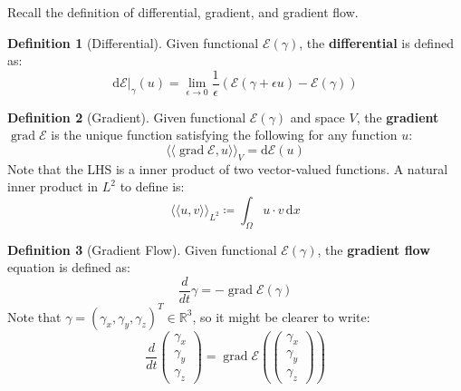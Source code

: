 \documentclass[a4paper, 11pt]{article}
\newcommand{\dx}{\,\text{d}x}
\newcommand{\inner}[1]{\langle \langle #1 \rangle \rangle}
\DeclareMathOperator{\grad}{grad}
\theoremstyle{definition}
\newtheorem{definition}{Definition}
\theoremstyle{remark}
\begin{document}
Recall the definition of differential, gradient, and gradient flow.
\begin{definition}[Differential]
    Given functional $\mathcal{E}(\gamma)$, the \textbf{differential} is defined as:
    \begin{equation}
        \text{d}\mathcal{E}|_{\gamma} (u) = \lim_{\epsilon \rightarrow 0} \frac{1}{\epsilon} \left( \mathcal{E}\left( \gamma + \epsilon u \right) - \mathcal{E}\left( \gamma \right) \right)
    \end{equation}
\end{definition}

\begin{definition}[Gradient]
    Given functional $\mathcal{E}\left( \gamma \right)$ and space $V$, the \textbf{gradient} $\grad \mathcal{E}$ is the unique function satisfying the following for any function $u$:
    \begin{equation}
        \inner{\grad \mathcal{E}, u}_V = \text{d} \mathcal{E} (u)
    \end{equation}
    Note that the LHS is a inner product of two vector-valued functions.
    A natural inner product in $L^2$ to define is:
    \begin{equation}
        \inner{u,v}_{L^2} \coloneqq \int_{\Omega} u \cdot v \dx
    \end{equation}

\end{definition}

\begin{definition}[Gradient Flow]
    Given functional $\mathcal{E}(\gamma)$, the \textbf{gradient flow} equation is defined as:
    \begin{equation}
        \frac{d}{dt} \gamma = - \grad \mathcal{E} (\gamma)
    \end{equation}
    Note that $\gamma = \left( \gamma_x, \gamma_y, \gamma_z \right)^T \in \mathbb{R}^3$, so it might be clearer to write:
    \begin{equation}
        \frac{d}{dt}
        \begin{pmatrix}
            \gamma_x \\
            \gamma_y \\
            \gamma_z
        \end{pmatrix}
        =
        \grad \mathcal{E} \left( 
            \begin{pmatrix}
                \gamma_x \\
                \gamma_y \\
                \gamma_z
            \end{pmatrix}
        \right)
    \end{equation}
\end{definition}
\end{document}
